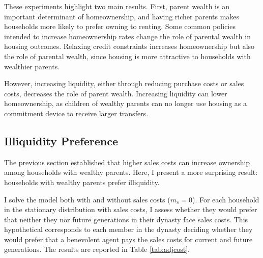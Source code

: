 \documentclass[12pt]{article}
\begin{document}
\begin{table} 
	\centering
\end{table}

These experiments highlight two main results. First, parent wealth is an important determinant of homeownership, and having richer parents makes households more likely to prefer owning to renting. Some common policies intended to increase homeownership rates change the role of parental wealth in housing outcomes. Relaxing credit constraints increases homeownership but also the role of parental wealth, since housing is more attractive to households with wealthier parents. 

However, increasing liquidity, either through reducing purchase costs or sales costs, decreases the role of parent wealth. Increasing liquidity can lower homeownership, as children of wealthy parents can no longer use housing as a commitment device to receive larger transfers.

\subsection{Illiquidity Preference}\label{sec:adjcost}
The previous section established that higher sales costs can increase ownership among households with wealthy parents. Here, I present a more surprising result: households with wealthy parents prefer illiquidity.

I solve the model both with and without sales costs ($m_s=0$). For each household in the stationary distribution with sales costs, I assess whether they would prefer that neither they nor future generations in their dynasty face sales costs. This hypothetical corresponds to each member in the dynasty deciding whether they would prefer that a benevolent agent pays the sales costs for current and future generations. The results are reported in Table \ref{tab:adjcost}.
\end{document}
